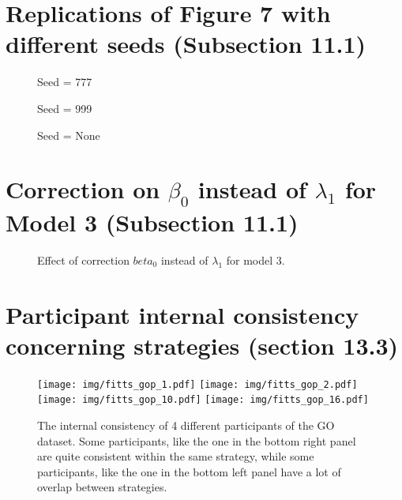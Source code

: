 \documentclass{article}
\begin{document}
\section{Replications of Figure 7 with different seeds (Subsection 11.1)}

\begin{figure}[htbp]
    \centering
    \caption{Seed = 777}
\end{figure}
\begin{figure}[htbp]
    \centering
    \caption{Seed = 999}
\end{figure}
\begin{figure}[htbp]
    \centering
    \caption{Seed = None}
\end{figure}

\section{Correction on $\beta_0$ instead of $\lambda_1$ for Model 3 (Subsection 11.1)}

\begin{figure}[htbp]
    \centering
    \caption{Effect of correction $beta_0$ instead of $\lambda_1$ for model 3.}
\end{figure}


\section{Participant internal consistency concerning strategies (section 13.3)}

\begin{figure}[htbp]
    \centering
    \texttt{[image: img/fitts\_gop\_1.pdf]}
    \texttt{[image: img/fitts\_gop\_2.pdf]} \\
    \texttt{[image: img/fitts\_gop\_10.pdf]}
    \texttt{[image: img/fitts\_gop\_16.pdf]}
    \caption{The internal consistency of 4 different participants of the GO dataset. Some participants, like the one in the bottom right panel are quite consistent within the same strategy, while some participants, like the one in the bottom left panel have a lot of overlap between strategies.}
\end{figure}
\end{document}

